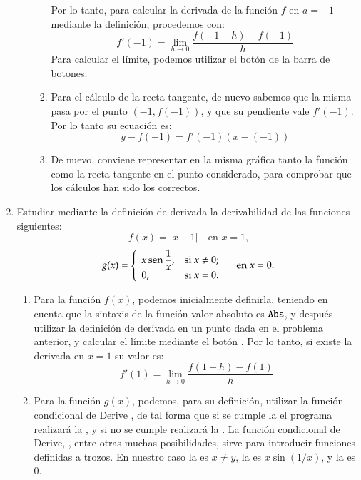 \begin{enumerate}[leftmargin=*]
\begin{enumerate}
\begin{indicacion}
\begin{enumerate}
Por lo tanto, para calcular la derivada de la función $f$ en $a=-1$ mediante la definición, procedemos con:
\[
f'(-1) = \mathop {\lim }\limits_{h \to 0} \frac{{f(-1 + h) - f(-1)}}
{h}
\]
Para calcular el límite, podemos utilizar el botón  de la barra de botones.
\item Para el cálculo de la recta tangente, de nuevo sabemos que la misma pasa por el punto $(-1, f(-1))$, y que su pendiente vale $f'(-1)$.
Por lo tanto su ecuación es:
\[
y - f( - 1) = f'(-1)\left( {x - ( - 1)} \right)
\]
\item De nuevo, conviene representar en la misma gráfica tanto la función como la recta tangente en el punto considerado, para comprobar que
los cálculos han sido los correctos.
\end{enumerate}
\end{indicacion}
\end{enumerate}


\item Estudiar mediante la definición de derivada la derivabilidad de las funciones siguientes:
\[
f(x)=|x-1| \quad \textrm{en $x=1$,}
\]
\[
g(x)=\left\{
\begin{array}{ll}
x \operatorname{sen}\dfrac{1}{x}, & \hbox{si $x\neq 0$;} \\
0, & \hbox{si $x=0$.} \\
\end{array}
\right. \quad \textrm{en $x=0$.}
\]

\begin{indicacion}
\begin{enumerate}
\item Para la función $f(x)$, podemos inicialmente definirla, teniendo en cuenta que la sintaxis de la función valor absoluto es
$\texttt{Abs}$, y después utilizar la definición de derivada en un punto dada en el problema anterior, y calcular el límite mediante el
botón . Por lo tanto, si existe la derivada en $x=1$ su valor es:
\[
f'(1) = \mathop {\lim }\limits_{h \to 0} \frac{{f(1 + h) - f(1)}}
{h}
\]
\item Para la función $g(x)$, podemos, para su definición, utilizar la función condicional de Derive , de tal forma que si se cumple la  el programa realizará la , y si no se cumple realizará la
. La función condicional de Derive, , entre otras muchas posibilidades, sirve para introducir funciones
definidas a trozos. En nuestro caso la  es $x\neq y$, la  es $x\sin(1/x)$, y la  es
$0$.


\end{enumerate}
\end{indicacion}
\end{enumerate}
